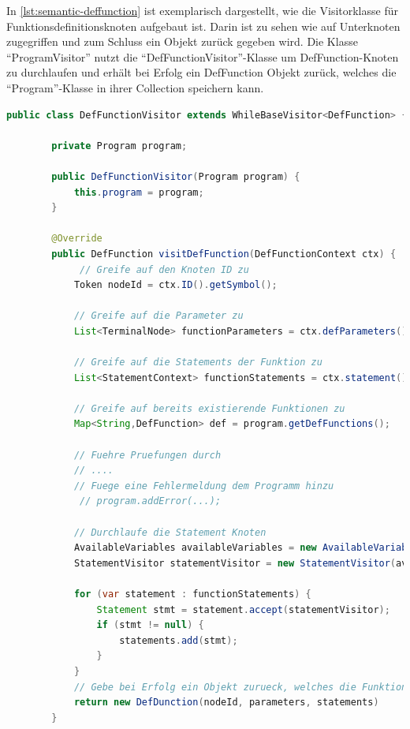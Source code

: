 In \cref{lst:semantic-deffunction} ist exemplarisch dargestellt, wie die Visitorklasse für Funktionsdefinitionsknoten aufgebaut ist. Darin ist zu sehen wie auf Unterknoten zugegriffen und zum Schluss ein Objekt zurück gegeben wird. Die Klasse \enquote{ProgramVisitor} nutzt die \enquote{DefFunctionVisitor}-Klasse um DefFunction-Knoten zu durchlaufen und erhält bei Erfolg ein DefFunction Objekt zurück, welches die \enquote{Program}-Klasse in ihrer Collection speichern kann.

\begin{lstlisting}[language=java, caption=Prinzipieller Aufbau einer Visitorklasse, label={lst:semantic-deffunction}]
	public class DefFunctionVisitor extends WhileBaseVisitor<DefFunction> {
		
		private Program program;
		
		public DefFunctionVisitor(Program program) {
			this.program = program;
		}
		
		@Override
		public DefFunction visitDefFunction(DefFunctionContext ctx) {
			 // Greife auf den Knoten ID zu
			Token nodeId = ctx.ID().getSymbol();
			
			// Greife auf die Parameter zu
			List<TerminalNode> functionParameters = ctx.defParameters().ID();
			
			// Greife auf die Statements der Funktion zu
			List<StatementContext> functionStatements = ctx.statement(); 
			
			// Greife auf bereits existierende Funktionen zu
			Map<String,DefFunction> def = program.getDefFunctions();
			
			// Fuehre Pruefungen durch
			// ....
			// Fuege eine Fehlermeldung dem Programm hinzu 
			 // program.addError(...);
			
			// Durchlaufe die Statement Knoten
			AvailableVariables availableVariables = new AvailableVariables();
			StatementVisitor statementVisitor = new StatementVisitor(availableVariables, programm);
			
			for (var statement : functionStatements) {
				Statement stmt = statement.accept(statementVisitor);
				if (stmt != null) {
					statements.add(stmt);
				}
			}
			// Gebe bei Erfolg ein Objekt zurueck, welches die Funktion abbildet
			return new DefDunction(nodeId, parameters, statements)
		}
\end{lstlisting}

